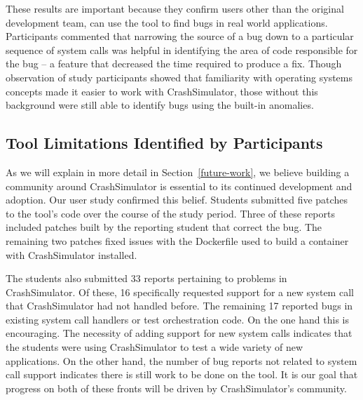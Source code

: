 These results are important
because they confirm
users other than the original development team,
can use the tool to find bugs in real world applications.
Participants commented that narrowing the source of a bug
down to a particular sequence of system calls
was helpful in identifying the area of
code responsible for the bug -- a feature
that decreased the time required to produce a fix.
Though observation of study participants
showed that familiarity with operating systems concepts
made it easier to work with CrashSimulator,
those without this background were still able to identify bugs using the
built-in anomalies.

\subsection{Tool Limitations Identified by Participants}
\label{subsec:crashsim-patches}

As we will explain in more detail in Section~\ref{future-work},
we believe building a community around CrashSimulator is essential to its
continued development and adoption.  Our user study confirmed this belief.
Students submitted five patches
to the tool's code over the
course of the study period.
Three of these reports included patches built by the reporting student that
correct the bug.
The remaining two patches fixed issues with the
Dockerfile used to build a container with CrashSimulator installed.

The students also submitted 33 reports pertaining to problems in CrashSimulator.
Of these, 16 specifically requested support for a new system call that
CrashSimulator had not handled before.  The remaining 17 reported bugs in
existing system call handlers or test orchestration code.
On the one hand this is encouraging.  The necessity of adding
support for new system calls
indicates that the students were
using CrashSimulator to test a wide variety of new applications.
On the other hand, the number of bug reports not related to system call support
indicates there is still work to be done on the tool.
It is our goal that progress on both of these fronts will be driven by
CrashSimulator's community.

